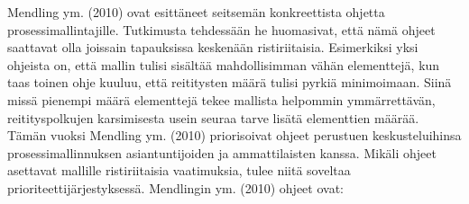 \documentclass[
  finnish,
  letterpaper,
  DIV=11,
  numbers=noendperiod,
  oneside]{scrreprt}
\begin{document}
Mendling ym. (2010) ovat esittäneet seitsemän konkreettista ohjetta
prosessimallintajille. Tutkimusta tehdessään he huomasivat, että nämä
ohjeet saattavat olla joissain tapauksissa keskenään ristiriitaisia.
Esimerkiksi yksi ohjeista on, että mallin tulisi sisältää mahdollisimman
vähän elementtejä, kun taas toinen ohje kuuluu, että reititysten määrä
tulisi pyrkiä minimoimaan. Siinä missä pienempi määrä elementtejä tekee
mallista helpommin ymmärrettävän, reitityspolkujen karsimisesta usein
seuraa tarve lisätä elementtien määrää. Tämän vuoksi Mendling ym. (2010)
priorisoivat ohjeet perustuen keskusteluihinsa prosessimallinnuksen
asiantuntijoiden ja ammattilaisten kanssa. Mikäli ohjeet asettavat
mallille ristiriitaisia vaatimuksia, tulee niitä soveltaa
prioriteettijärjestyksessä. Mendlingin ym. (2010) ohjeet ovat:
\end{document}
